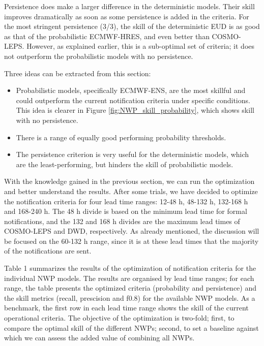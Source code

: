 \documentclass[preprint,12pt]{elsarticle}
\begin{document}
Persistence does make a larger difference in the deterministic models. Their skill improves dramatically as soon as some persistence is added in the criteria. For the most stringent persistence (3/3), the skill of the deterministic EUD is as good as that of the probabilistic ECMWF-HRES, and even better than COSMO-LEPS. However, as explained earlier, this is a sub-optimal set of criteria; it does not outperform the probabilistic models with no persistence.

Three ideas can be extracted from this section:
\begin{itemize}
    \item Probabilistic models, specifically ECMWF-ENS, are the most skillful and could outperform the current notification criteria under specific conditions. This idea is clearer in Figure \ref{fig:NWP_skill_probability}, which shows skill with no persistence.
    \item There is a range of equally good performing probability thresholds.
    \item The persistence criterion is very useful for the deterministic models, which are the least-performing, but hinders the skill of probabilistic models.
\end{itemize}

With the knowledge gained in the previous section, we can run the optimization and better understand the results. After some trials, we have decided to optimize the notification criteria for four lead time ranges: 12-48 h, 48-132 h, 132-168 h and 168-240 h. The 48 h divide is based on the minimum lead time for formal notifications, and the 132 and 168 h divides are the maximum lead times of COSMO-LEPS and DWD, respectively. As already mentioned, the discussion will be focused on the 60-132 h range, since it is at these lead times that the majority of the notifications are sent.

Table 1 summarizes the results of the optimization of notification criteria for the individual NWP models. The results are organised by lead time ranges; for each range, the table presents the optimized criteria (probability and persistence) and the skill metrics (recall, prescision and f0.8) for the available NWP models. As a benchmark, the first row in each lead time range shows the skill of the current operational criteria. The objective of the optimization is two-fold; first, to compare the optimal skill of the different NWPs; second, to set a baseline against which we can assess the added value of combining all NWPs.
\end{document}
